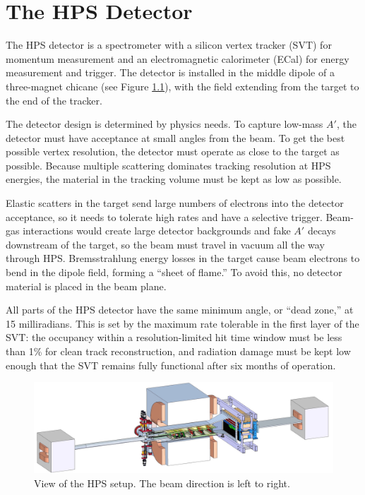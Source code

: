 \chapter{The HPS Detector}

The HPS detector is a spectrometer with a silicon vertex tracker (SVT) for momentum measurement and an electromagnetic calorimeter (ECal) for energy measurement and trigger.
The detector is installed in the middle dipole of a three-magnet chicane (see Figure \ref{fig:hps-pic}), with the field extending from the target to the end of the tracker.

The detector design is determined by physics needs.
To capture low-mass $A'$, the detector must have acceptance at small angles from the beam.
To get the best possible vertex resolution, the detector must operate as close to the target as possible.
Because multiple scattering dominates tracking resolution at HPS energies, the material in the tracking volume must be kept as low as possible.

Elastic scatters in the target send large numbers of electrons into the detector acceptance, so it needs to tolerate high rates and have a selective trigger.
Beam-gas interactions would create large detector backgrounds and fake $A'$ decays downstream of the target, so the beam must travel in vacuum all the way through HPS.
Bremsstrahlung energy losses in the target cause beam electrons to bend in the dipole field, forming a ``sheet of flame.'' To avoid this, no detector material is placed in the beam plane.

All parts of the HPS detector have the same minimum angle, or ``dead zone,'' at 15 milliradians.
This is set by the maximum rate tolerable in the first layer of the SVT: the occupancy within a resolution-limited hit time window must be less than 1\% for clean track reconstruction, and radiation damage must be kept low enough that the SVT remains fully functional after six months of operation.

\begin{figure}[htp]
    \includegraphics[width=\textwidth]{detector/figs/HPS-pic}
    \caption{View of the HPS setup.
    The beam direction is left to right.}
    \label{fig:hps-pic}
\end{figure}


